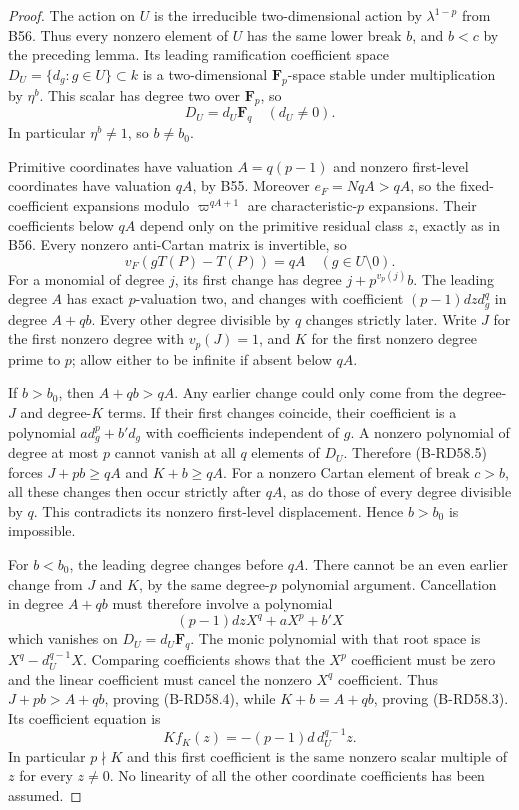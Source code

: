\begin{proof}
The action on $U$ is the irreducible two-dimensional action by
$\lambda^{1-p}$ from B56. Thus every nonzero element of $U$ has
the same lower break $b$, and $b<c$ by the preceding lemma.
Its leading ramification coefficient space
$D_U=\{d_g:g\in U\}\subset k$ is a two-dimensional
$\mathbf F_p$-space stable under multiplication by $\eta^b$.
This scalar has degree two over $\mathbf F_p$, so
\[
                 D_U=d_U\mathbf F_q\quad(d_U\ne0).
\]
In particular $\eta^b\ne1$, so $b\ne b_0$.

Primitive coordinates have valuation $A=q(p-1)$ and nonzero
first-level coordinates have valuation $qA$, by B55. Moreover
$e_F=NqA>qA$, so the fixed-coefficient expansions modulo
$\varpi^{qA+1}$ are characteristic-$p$ expansions. Their coefficients
below $qA$ depend only on the primitive residual class $z$, exactly
as in B56. Every nonzero anti-Cartan matrix is invertible, so
\[
                      v_F(gT(P)-T(P))=qA\quad(g\in U\setminus0).
                                                               \tag{B-RD58.5}
\]
For a monomial of degree $j$, its first change has degree
$j+p^{v_p(j)}b$. The leading degree $A$ has exact $p$-valuation
two, and changes with coefficient $(p-1)d z d_g^q$ in degree
$A+qb$. Every other degree divisible by $q$ changes strictly later.
Write $J$ for the first nonzero degree with $v_p(J)=1$, and $K$
for the first nonzero degree prime to $p$; allow either to be
infinite if absent below $qA$.

If $b>b_0$, then $A+qb>qA$. Any earlier change could only come
from the degree-$J$ and degree-$K$ terms. If their first changes
coincide, their coefficient is a polynomial
$a d_g^p+b' d_g$ with coefficients independent of $g$.
A nonzero polynomial of degree at most $p$ cannot vanish at all
$q$ elements of $D_U$. Therefore (B-RD58.5) forces
$J+pb\ge qA$ and $K+b\ge qA$.
For a nonzero Cartan element of break $c>b$, all these changes
then occur strictly after $qA$, as do those of every degree
divisible by $q$. This contradicts its nonzero first-level
displacement. Hence $b>b_0$ is impossible.

For $b<b_0$, the leading degree changes before $qA$.
There cannot be an even earlier change from $J$ and $K$, by
the same degree-$p$ polynomial argument. Cancellation in degree
$A+qb$ must therefore involve a polynomial
\[
              (p-1)d z X^q+a X^p+b'X
\]
which vanishes on $D_U=d_U\mathbf F_q$.
The monic polynomial with that root space is
$X^q-d_U^{q-1}X$. Comparing coefficients shows that the
$X^p$ coefficient must be zero and the linear coefficient
must cancel the nonzero $X^q$ coefficient.
Thus $J+pb>A+qb$, proving (B-RD58.4), while
$K+b=A+qb$, proving (B-RD58.3). Its coefficient equation is
\[
 K f_K(z)=-(p-1)d\,d_U^{q-1}z.                           \tag{B-RD58.6}
\]
In particular $p\nmid K$ and this first coefficient is the same
nonzero scalar multiple of $z$ for every $z\ne0$.
No linearity of all the other coordinate coefficients has been
assumed.
\end{proof}

